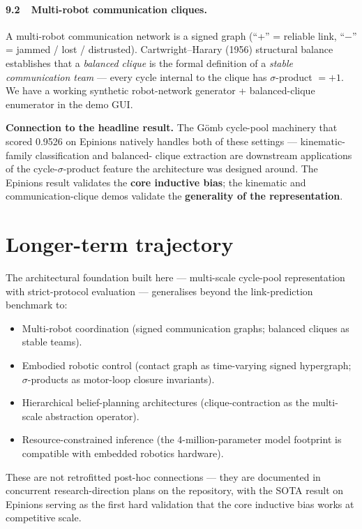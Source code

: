 \documentclass[11pt,a4paper]{article}
\newcommand{\sig}{\ensuremath{\sigma}}
\begin{document}
\paragraph{9.2\ \ Multi-robot communication cliques.} A multi-robot
communication network is a signed graph (``+'' = reliable link,
``$-$'' = jammed / lost / distrusted). Cartwright--Harary (1956)
structural balance establishes that a \emph{balanced clique} is the
formal definition of a \emph{stable communication team} --- every
cycle internal to the clique has \sig-product $= +1$. We have a
working synthetic robot-network generator + balanced-clique
enumerator in the demo GUI.

\textbf{Connection to the headline result.} The G\"omb cycle-pool
machinery that scored 0.9526 on Epinions natively handles both of
these settings --- kinematic-family classification and balanced-
clique extraction are downstream applications of the
cycle-\sig-product feature the architecture was designed around.
The Epinions result validates the \textbf{core inductive bias}; the
kinematic and communication-clique demos validate the
\textbf{generality of the representation}.

\section{Longer-term trajectory}

The architectural foundation built here --- multi-scale cycle-pool
representation with strict-protocol evaluation --- generalises
beyond the link-prediction benchmark to:

\begin{itemize}
  \item Multi-robot coordination (signed communication graphs;
    balanced cliques as stable teams).
  \item Embodied robotic control (contact graph as time-varying
    signed hypergraph; \sig-products as motor-loop closure invariants).
  \item Hierarchical belief-planning architectures (clique-contraction
    as the multi-scale abstraction operator).
  \item Resource-constrained inference (the 4-million-parameter
    model footprint is compatible with embedded robotics hardware).
\end{itemize}

These are not retrofitted post-hoc connections --- they are
documented in concurrent research-direction plans on the
repository, with the SOTA result on Epinions serving as the first
hard validation that the core inductive bias works at competitive
scale.
\end{document}
